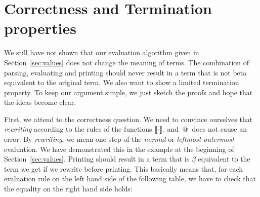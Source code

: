 \documentclass[submission,copyright,creativecommons]{eptcs}
\begin{document}
\section{Correctness and Termination properties}
\label{sec:sound}



We still have not shown that our evaluation algorithm given in Section~\ref{sec:values} does not change the meaning of terms. The combination of parsing, evaluating and printing should never result in a term that is not beta equivalent to the original term. We also want to show a limited termination property.
To keep our argument simple, we just sketch the proofs and hope that the ideas become clear.

First, we attend to the correctness question. 
We need to convince ourselves that \emph{rewriting} according to the rules of the functions $\llbracket{\cdot}\rrbracket_{\cdot}$ and $\,@\,$ does not cause an error. 
By \emph{rewriting}, we mean one step of the \emph{normal} or \emph{leftmost outermost} evaluation. We have demonstrated this in the example at the beginning of Section~\ref{sec:values}.
Printing should result in a term that is $\beta$ equivalent to the term we get if we rewrite before printing. 
This basically means that, for each evaluation rule on the left hand
side of the following table, we have to check that the equality on the
right hand side holds:
\end{document}
